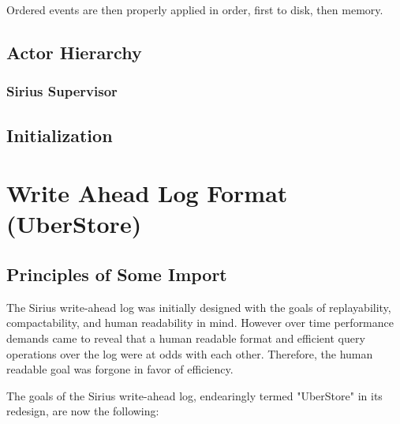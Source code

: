 \documentclass[11pt]{article}
\begin{document}
Ordered events are then properly applied in order, first to disk, then memory.

\subsection{Actor Hierarchy}

\subsubsection{Sirius Supervisor}

\subsection{Initialization}

\section{Write Ahead Log Format (UberStore)}

\subsection{Principles of Some Import}
The Sirius write-ahead log was initially designed with the goals of replayability,
compactability, and human readability in mind. However over time performance demands
came to reveal that a human readable format and efficient query operations over the
log were at odds with each other.  Therefore, the human readable goal was forgone
in favor of efficiency.

The goals of the Sirius write-ahead log, endearingly termed "UberStore" in its redesign,
are now the following:
\end{document}
